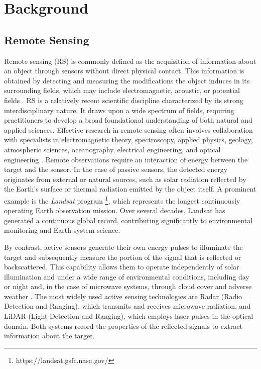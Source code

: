\chapter{Background}
\label{chapter:background}
\section{Remote Sensing}
Remote sensing (RS) is commonly defined as the acquisition of information about an object through sensors without direct physical contact. This information is obtained by detecting and measuring the modifications the object induces in its surrounding fields, which may include electromagnetic, acoustic, or potential fields \cite{book_Physics_Techniques_RS}.
RS is a relatively recent scientific discipline characterized by its strong interdisciplinary nature. It draws upon a wide spectrum of fields, requiring practitioners to develop a broad foundational understanding of both natural and applied sciences. Effective research in remote sensing often involves collaboration with specialists in electromagnetic theory, spectroscopy, applied physics, geology, atmospheric sciences, oceanography, electrical engineering, and optical engineering \cite{book_Physics_Techniques_RS}.
Remote observations require an interaction of energy between the target and the sensor. In the case of passive sensors, the detected energy originates from external or natural sources, such as solar radiation reflected by the Earth's surface or thermal radiation emitted by the object itself. A prominent example is the \textit{Landsat} program \footnote{https://landsat.gsfc.nasa.gov/}, which represents the longest continuously operating Earth observation mission. Over several decades, Landsat has generated a continuous global record, contributing significantly to environmental monitoring and Earth system science.

By contrast, active sensors generate their own energy pulses to illuminate the target and subsequently measure the portion of the signal that is reflected or backscattered. This capability allows them to operate independently of solar illumination and under a wide range of environmental conditions, including day or night and, in the case of microwave systems, through cloud cover and adverse weather \cite{RS_platforms_survey}. The most widely used active sensing technologies are Radar (Radio Detection and Ranging), which transmits and receives microwave radiation, and LiDAR (Light Detection and Ranging), which employs laser pulses in the optical domain. Both systems record the properties of the reflected signals to extract information about the target.

